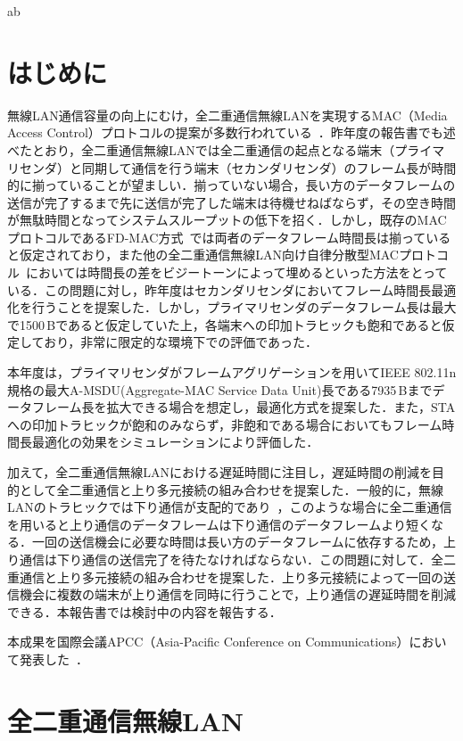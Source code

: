 \documentclass[technicalreport]{ieicej}
\begin{document}
ab
\clearpage

\section{はじめに}
無線LAN通信容量の向上にむけ，全二重通信無線LANを実現するMAC（Media Access Control）プロトコルの提案が多数行われている~\cite{fdmac,goyal,contra}．昨年度の報告書でも述べたとおり，全二重通信無線LANでは全二重通信の起点となる端末（プライマリセンダ）と同期して通信を行う端末（セカンダリセンダ）のフレーム長が時間的に揃っていることが望ましい．揃っていない場合，長い方のデータフレームの送信が完了するまで先に送信が完了した端末は待機せねばならず，その空き時間が無駄時間となってシステムスループットの低下を招く．しかし，既存のMACプロトコルであるFD-MAC方式~\cite{fdmac}では両者のデータフレーム時間長は揃っていると仮定されており，また他の全二重通信無線LAN向け自律分散型MACプロトコル~\cite{goyal, contra}においては時間長の差をビジートーンによって埋めるといった方法をとっている．この問題に対し，昨年度はセカンダリセンダにおいてフレーム時間長最適化を行うことを提案した．しかし，プライマリセンダのデータフレーム長は最大で1500\,Bであると仮定していた上，各端末への印加トラヒックも飽和であると仮定しており，非常に限定的な環境下での評価であった．
\par
本年度は，プライマリセンダがフレームアグリゲーションを用いてIEEE 802.11n規格の最大A-MSDU(Aggregate-MAC Service Data Unit)長である7935\,Bまでデータフレーム長を拡大できる場合を想定し，最適化方式を提案した．また，STAへの印加トラヒックが飽和のみならず，非飽和である場合においてもフレーム時間長最適化の効果をシミュレーションにより評価した．
\par
加えて，全二重通信無線LANにおける遅延時間に注目し，遅延時間の削減を目的として全二重通信と上り多元接続の組み合わせを提案した．一般的に，無線LANのトラヒックでは下り通信が支配的であり~\cite{traffic}，このような場合に全二重通信を用いると上り通信のデータフレームは下り通信のデータフレームより短くなる．一回の送信機会に必要な時間は長い方のデータフレームに依存するため，上り通信は下り通信の送信完了を待たなければならない．この問題に対して．全二重通信と上り多元接続の組み合わせを提案した．上り多元接続によって一回の送信機会に複数の端末が上り通信を同時に行うことで，上り通信の遅延時間を削減できる．本報告書では検討中の内容を報告する．
\par
本成果を国際会議APCC（Asia-Pacific Conference on Communications）において発表した~\cite{myapcc}．
\section{全二重通信無線LAN\label{モデル}}
\end{document}
